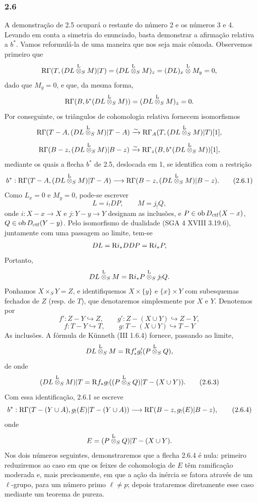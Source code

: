\subsubsection*{2.6}
A demonstração de 2.5 ocupará o restante do número 2 e os números 3 e 4. Levando em conta a simetria do enunciado, basta demonstrar a afirmação relativa a $b^*$. Vamos reformulá-la de uma maneira que nos seja mais cômoda. Observemos primeiro que
\[
\mathrm{R}\Gamma(T,(DL\overset{\mathrm L}{\otimes}_SM)|T)
 =(DL\overset{\mathrm L}{\otimes}_SM)_z
 =(DL)_x\overset{\mathrm L}{\otimes} M_y=0,
\]
dado que $M_y=0$, e que, da mesma forma,
\[
\mathrm{R}\Gamma(B,b^*(DL\overset{\mathrm L}{\otimes}_SM))
 =(DL\overset{\mathrm L}{\otimes}_SM)_z=0.
\]
Por conseguinte, os triângulos de cohomologia relativa fornecem isomorfismos
\[
\mathrm{R}\Gamma(T-A,(DL\overset{\mathrm L}{\otimes}_SM)|T-A)
 \xrightarrow{\sim}
\mathrm{R}\Gamma_A(T,(DL\overset{\mathrm L}{\otimes}_SM)|T)[1],
\]
\[
\mathrm{R}\Gamma(B-z,(DL\overset{\mathrm L}{\otimes}_SM)|B-z)
 \xrightarrow{\sim}
\mathrm{R}\Gamma_z(B,b^*(DL\overset{\mathrm L}{\otimes}_SM))[1],
\]
mediante os quais a flecha $b^*$ de 2.5, deslocada em 1, se identifica com a restrição
\begin{equation}
b^*:\mathrm{R}\Gamma(T-A,(DL\overset{\mathrm L}{\otimes}_SM)|T-A)
 \longrightarrow \mathrm{R}\Gamma(B-z,(DL\overset{\mathrm L}{\otimes}_SM)|B-z).
\tag{2.6.1}
\end{equation}
Como $L_x=0$ e $M_y=0$, pode-se escrever
\begin{equation}
L=i_!DP,\qquad M=j_!Q,
\tag{2.6.2}
\end{equation}
onde $i:X-x\to X$ e $j:Y-y\to Y$ designam as inclusões, e $P\in\operatorname{ob} D_{\mathrm{ctf}}(X-x)$, $Q\in\operatorname{ob} D_{\mathrm{ctf}}(Y-y)$. Pelo isomorfismo de dualidade (SGA 4 XVIII 3.19.6), juntamente com uma passagem ao limite, tem-se
\[
DL=\mathrm{R} i_*DDP=\mathrm{R} i_*P,
\]
Portanto,
\[
DL\overset{\mathrm L}{\otimes}_SM=\mathrm{R} i_*P\overset{\mathrm L}{\otimes}_Sj_!Q.
\]
Ponhamos $X\times_SY=Z$, e identifiquemos $X\times\{y\}$ e $\{x\}\times Y$ com subesquemas fechados de $Z$ (resp. de $T$), que denotaremos simplesmente por $X$ e $Y$. Denotemos por
\[
f':Z-Y\hookrightarrow Z,\qquad
g':Z-(X\cup Y)\hookrightarrow Z-Y,
\]
\[
f:T-Y\hookrightarrow T,\qquad
g:T-(X\cup Y)\hookrightarrow T-Y
\]
As inclusões. A fórmula de Künneth (III 1.6.4) fornece, passando ao limite,
\[
DL\overset{\mathrm L}{\otimes}_SM=\mathrm{R} f'_*g'_!(P\overset{\mathrm L}{\otimes}_SQ),
\]
de onde
\begin{equation}
(DL\overset{\mathrm L}{\otimes}_SM)|T=\mathrm{R} f_*g_!((P\overset{\mathrm L}{\otimes}_SQ)|T-(X\cup Y)).
\tag{2.6.3}
\end{equation}
Com essa identificação, 2.6.1 se escreve
\begin{equation}
b^*:\mathrm{R}\Gamma(T-(Y\cup A),g_!(E)|T-(Y\cup A))
 \longrightarrow \mathrm{R}\Gamma(B-z,g_!(E)|B-z),
\tag{2.6.4}
\end{equation}
onde
\[
E=(P\overset{\mathrm L}{\otimes}_SQ)|T-(X\cup Y).
\]
Nos dois números seguintes, demonstraremos que a flecha 2.6.4 é nula: primeiro reduziremos ao caso em que os feixes de cohomologia de $E$ têm ramificação moderada e, mais precisamente, em que a ação da inércia se fatora através de um $\ell$-grupo, para um número primo $\ell\ne p$; depois trataremos diretamente esse caso mediante um teorema de pureza.
